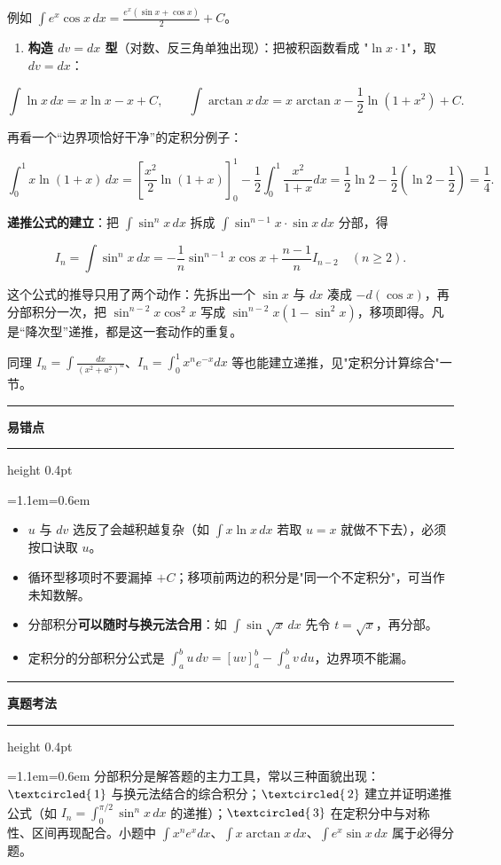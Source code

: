 \documentclass[11pt,openany,UTF8]{ctexbook}
\newcommand{\circled}[1]{\textcircled{\scriptsize\,#1}}
\newcommand{\callouthead}[2]{%
  \par\addvspace{7pt}\noindent
  {\color{#1}\rule[-0.15em]{3pt}{1.05em}}\hspace{0.5em}%
  {\bfseries\color{#1}#2}\par\nobreak\vspace{-0.35em}%
  {\color{rulesep}\hrule height 0.4pt}\nobreak\vspace{0.45em}%
  \begingroup\small\setlength{\parindent}{0pt}%
  \leftskip=1.1em\rightskip=0.6em\noindent\ignorespaces}
\newcommand{\calloutend}{\par\endgroup\addvspace{7pt}}
\newenvironment{callwarn}[1]{\callouthead{warnbar}{#1}}{\calloutend}
\newenvironment{callexam}[1]{\callouthead{exambar}{#1}}{\calloutend}
\begin{document}
例如 $\int e^{x}\cos x\,dx=\frac{e^{x}\left(\sin x+\cos x\right)}{2}+C$。

\begin{enumerate}
\item \textbf{构造 $dv=dx$ 型}（对数、反三角单独出现）：把被积函数看成 "$\ln x\cdot 1$"，取 $dv=dx$：
\end{enumerate}
\[\int\ln x\,dx=x\ln x-x+C,\qquad \int\arctan x\,dx=x\arctan x-\frac{1}{2}\ln(1+x^2)+C.\]

再看一个“边界项恰好干净”的定积分例子：

\[\int_0^1x\ln(1+x)\,dx=\left[\frac{x^2}{2}\ln(1+x)\right]_0^1-\frac{1}{2}\int_0^1\frac{x^2}{1+x}dx=\frac{1}{2}\ln 2-\frac{1}{2}\left(\ln 2-\frac{1}{2}\right)=\frac{1}{4}.\]

\textbf{递推公式的建立}：把 $\int \sin^n x\,dx$ 拆成 $\int \sin^{n-1}x\cdot\sin x\,dx$ 分部，得

\[I_n=\int\sin^n x\,dx=-\frac{1}{n}\sin^{n-1}x\cos x+\frac{n-1}{n}I_{n-2}\quad(n\geq 2).\]

这个公式的推导只用了两个动作：先拆出一个 $\sin x$ 与 $dx$ 凑成 $-d(\cos x)$，再分部积分一次，把 $\sin^{n-2}x\cos^2x$ 写成 $\sin^{n-2}x(1-\sin^2x)$，移项即得。凡是“降次型”递推，都是这一套动作的重复。

同理 $I_n=\int\frac{dx}{\left(x^2+a^2\right)^n}$、$I_n=\int_0^1x^ne^{-x}dx$ 等也能建立递推，见"定积分计算综合"一节。

\begin{callwarn}{易错点}
\begin{itemize}
\item $u$ 与 $dv$ 选反了会越积越复杂（如 $\int x\ln x\,dx$ 若取 $u=x$ 就做不下去），必须按口诀取 $u$。
\item 循环型移项时不要漏掉 $+C$；移项前两边的积分是"同一个不定积分"，可当作未知数解。
\item 分部积分\textbf{可以随时与换元法合用}：如 $\int\sin\sqrt{x}\,dx$ 先令 $t=\sqrt{x}$，再分部。
\item 定积分的分部积分公式是 $\int_a^bu\,dv=\left[uv\right]_a^b-\int_a^bv\,du$，边界项不能漏。
\end{itemize}
\end{callwarn}

\begin{callexam}{真题考法}
分部积分是解答题的主力工具，常以三种面貌出现：$\circled{1}$ 与换元法结合的综合积分；$\circled{2}$ 建立并证明递推公式（如 $I_n=\int_0^{\pi/2}\sin^nx\,dx$ 的递推）；$\circled{3}$ 在定积分中与对称性、区间再现配合。小题中 $\int x^ne^{x}dx$、$\int x\arctan x\,dx$、$\int e^x\sin x\,dx$ 属于必得分题。

\end{callexam}
\end{document}
